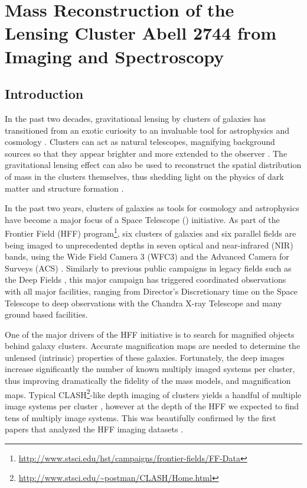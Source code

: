 
\chapter{Mass Reconstruction of the Lensing Cluster Abell 2744 from \protect\hff Imaging and \protect\glass Spectroscopy}


\section{Introduction}
\label{sec:intro}

In the past two decades, gravitational lensing by clusters of galaxies has transitioned from an exotic curiosity to an invaluable 
tool for astrophysics and cosmology \cite[e.g.][]{K+N11}. Clusters can act as natural telescopes, magnifying background sources so 
that they appear brighter and more extended to the observer \cite[e.g.][]{Yee++96,Pet++02,Shi++14,Bay++14}.  The 
gravitational lensing effect can also be used to reconstruct the spatial distribution of mass in the clusters themselves, thus 
shedding light on the physics of dark matter and structure formation 
\citep[e.g.][]{clowe06,Bra++06,San++08,New++13,Sha++14,2015ApJ...806....4M}.

In the past two years, clusters of galaxies as tools for cosmology and
astrophysics have become a major focus of a \hubble Space Telescope
(\hst) initiative. As part of the \hubble Frontier Field (HFF) program\footnote{\url{http://www.stsci.edu/hst/campaigns/frontier-fields/FF-Data}},
six clusters of galaxies and six parallel fields are being imaged to
unprecedented depths in seven optical and near-infrared (NIR) bands, using
the Wide Field Camera 3 (WFC3) and the Advanced Camera for Surveys
(ACS) \citep{2015ApJ...800...84C}. Similarly to previous public campaigns in
legacy fields such as the \hubble Deep Fields
\citep{Wil++96,Ferguson:2000p22537}, this major \hst campaign has
triggered coordinated observations with all major facilities, ranging
from Director's Discretionary time on the \spitzer Space Telescope to
deep observations with the Chandra X-ray Telescope and many ground
based facilities.

One of the major drivers of the HFF initiative is to search for
magnified objects behind galaxy clusters. Accurate magnification maps
are needed to determine the unlensed (intrinsic) properties of these
galaxies. Fortunately, the deep images increase significantly the
number of known multiply imaged systems per cluster, thus improving
dramatically the fidelity of the mass models, and magnification
maps. Typical CLASH\footnote{\url{http://www.stsci.edu/~postman/CLASH/Home.html}}-like depth imaging of clusters
\citep[limiting magnitude $\sim$ 27 ABmag for a 5-$\sigma$ point
source][]{Postman:2012p27556} yields a handful of multiple image
systems per cluster \cite[e.g.][]{Joh++14}, however at the depth of the HFF
we expected to find tens of multiply image systems. This was
beautifully confirmed by the first papers that analyzed the HFF
imaging datasets
\citep[e.g.][]{2014arXiv1409.8663J,Ish++15,Lap++15}.

